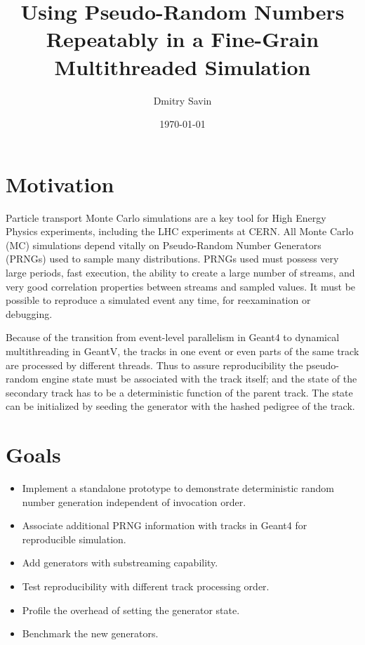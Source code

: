 \documentclass[a4paper, 12pt]{article} %
\title{Using Pseudo-Random Numbers Repeatably in a Fine-Grain Multithreaded Simulation}
\author{Dmitry Savin}
\date{\today}
\begin{document}
 \maketitle

 \section*{ Motivation }
  Particle transport Monte Carlo simulations are a key tool for High Energy Physics experiments, including the LHC experiments at CERN.
  All Monte Carlo (MC) simulations depend vitally on Pseudo-Random Number Generators (PRNGs) used to sample many distributions.
  PRNGs used must possess very large periods, fast execution, the ability to create a large number of streams, and very good correlation properties between streams and sampled values. It must be possible to reproduce a simulated event any time, for reexamination or debugging.

  Because of the transition from event-level parallelism in Geant4 to dynamical multithreading in GeantV, the tracks in one event or even parts of the same track are processed by different threads.
  Thus to assure reproducibility the pseudo-random engine state must be associated with the track itself;
  and the state of the secondary track has to be a deterministic function of the parent track.
  The state can be initialized by seeding the generator with the hashed pedigree of the track.
  
 \section*{ Goals }
 
  \begin{itemize}
   \item Implement a standalone prototype to demonstrate deterministic random number generation independent of invocation order.
   \item Associate additional PRNG information with tracks in Geant4 for reproducible simulation.
   \item Add generators with substreaming capability.
   \item Test reproducibility with different track processing order.
   \item Profile the overhead of setting the generator state.
   \item Benchmark the new generators.
  \end{itemize}
  
\end{document}
